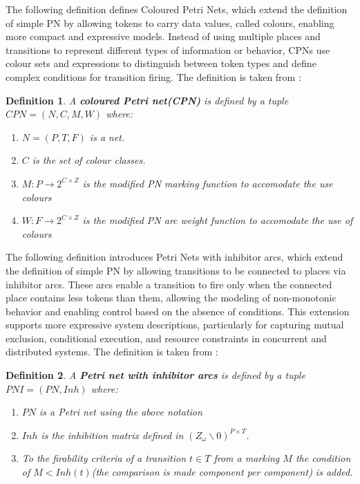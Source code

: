 \documentclass[12pt]{article}
\newtheorem{definition}{Definition}
\begin{document}
    The following definition defines Coloured Petri Nets, which extend the definition of simple PN by allowing tokens to carry data values, called colours, enabling more compact and expressive models. Instead of using multiple places and transitions to represent different types of information or behavior, CPNs use colour sets and expressions to distinguish between token types and define complex conditions for transition firing. 
    The definition is taken from \cite{girault2013petri}:
    \begin{definition}
        A \textbf{coloured Petri net(CPN)} is defined by a tuple \(CPN=(N,C,M,W)\) where: 
        \begin{enumerate}
            \item $N=(P,T,F)$ is a net.
            \item \(C\) is the set of colour classes.
            \item \(M: P \rightarrow 2^{C \times Z}\) is the modified PN marking function to accomodate the use colours
            \item \(W: F \rightarrow 2^{C \times Z}\) is the modified PN arc weight function to accomodate the use of colours
        \end{enumerate}
    \end{definition}
    The following definition introduces Petri Nets with inhibitor arcs, which extend the definition of simple PN by allowing transitions to be connected to places via inhibitor arcs. These arcs enable a transition to fire only when the connected place contains less tokens than them, allowing the modeling of non-monotonic behavior and enabling control based on the absence of conditions. This extension supports more expressive system descriptions, particularly for capturing mutual exclusion, conditional execution, and resource constraints in concurrent and distributed systems.
    The definition is taken from \cite{diaz2013petri}:
    \begin{definition}
        A \textbf{Petri net with inhibitor arcs} is defined by a tuple \(PNI=(PN,Inh)\) where: 
        \begin{enumerate}
            \item \(PN\) is a Petri net using the above notation
            \item \(Inh\) is the inhibition matrix defined in \((Z_\omega \backslash 0)^{P\times T}\).
            \item To the firability criteria of a transition \(t \in T\) from a marking $M$ the condition of $M<Inh(t)$(the comparison is made component per component) is added.
        \end{enumerate}
    \end{definition}
\end{document}
